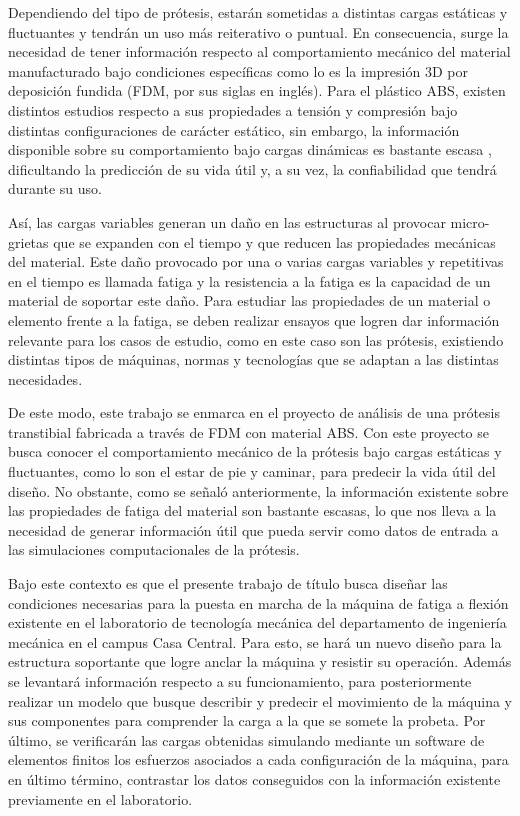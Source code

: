 Dependiendo del tipo de prótesis, estarán sometidas a distintas cargas estáticas y fluctuantes y tendrán un uso más reiterativo o puntual. En consecuencia, surge la necesidad de tener información respecto al comportamiento mecánico del material manufacturado bajo condiciones específicas como lo es la impresión 3D por deposición fundida (FDM, por sus siglas en inglés). Para el plástico ABS, existen distintos estudios respecto a sus propiedades a tensión y compresión bajo distintas configuraciones de carácter estático, sin embargo, la información disponible sobre su comportamiento bajo cargas dinámicas es bastante escasa \cite{lee2013fatigue}\cite{zhang2018tensile}, dificultando la predicción de su vida útil y, a su vez, la confiabilidad que tendrá durante su uso.

Así, las cargas variables generan un daño en las estructuras al provocar micro-grietas que se expanden con el tiempo y que reducen las propiedades mecánicas del material. Este daño provocado por una o varias cargas variables y repetitivas en el tiempo es llamada fatiga y la resistencia a la fatiga es la capacidad de un material de soportar este daño. Para estudiar las propiedades de un material o elemento frente a la fatiga, se deben realizar ensayos que logren dar información relevante para los casos de estudio, como en este caso son las prótesis, existiendo distintas tipos de máquinas, normas y tecnologías que se adaptan a las distintas necesidades.

De este modo, este trabajo se enmarca en el proyecto de análisis de una prótesis transtibial fabricada a través de FDM con material ABS. Con este proyecto se busca conocer el comportamiento mecánico de la prótesis bajo cargas estáticas y fluctuantes, como lo son el estar de pie y caminar, para predecir la vida útil del diseño. No obstante, como se señaló anteriormente, la información existente sobre las propiedades de fatiga del material son bastante escasas, lo que nos lleva a la necesidad de generar información útil que pueda servir como datos de entrada a las simulaciones computacionales de la prótesis.

Bajo este contexto es que el presente trabajo de título busca diseñar las condiciones necesarias para la puesta en marcha de la máquina de fatiga a flexión existente en el laboratorio de tecnología mecánica del departamento de ingeniería mecánica en el campus Casa Central. Para esto, se hará un nuevo diseño para la estructura soportante que logre anclar la máquina y resistir su operación. Además se levantará información respecto a su funcionamiento, para posteriormente realizar un modelo que busque describir y predecir el movimiento de la máquina y sus componentes para comprender la carga a la que se somete la probeta. Por último, se verificarán las cargas obtenidas simulando mediante un software de elementos finitos los esfuerzos asociados a cada configuración de la máquina, para en último término, contrastar los datos conseguidos con la información existente previamente en el laboratorio.

